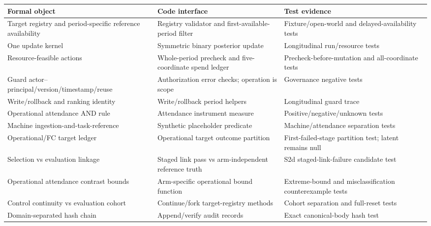\documentclass[
  11pt]{article}
\begin{document}
\begin{longtable}[]{@{}
  >{\raggedright\arraybackslash}p{}
  >{\raggedright\arraybackslash}p{}
  >{\raggedright\arraybackslash}p{}@{}}
\toprule\noalign{}
\begin{minipage}[b]{\linewidth}\raggedright
Formal object
\end{minipage} & \begin{minipage}[b]{\linewidth}\raggedright
Code interface
\end{minipage} & \begin{minipage}[b]{\linewidth}\raggedright
Test evidence
\end{minipage} \\
\midrule\noalign{}
\endhead
\bottomrule\noalign{}
\endlastfoot
Target registry and period-specific reference availability & Registry
validator and first-available-period filter & Fixture/open-world and
delayed-availability tests \\
One update kernel & Symmetric binary posterior update & Longitudinal
run/resource tests \\
Resource-feasible actions & Whole-period precheck and five-coordinate
spend ledger & Precheck-before-mutation and all-coordinate tests \\
Guard actor--principal/version/timestamp/reuse & Authorization error
checks; operation is scope & Governance negative tests \\
Write/rollback and ranking identity & Write/rollback period helpers &
Longitudinal guard trace \\
Operational attendance AND rule & Attendance instrument measure &
Positive/negative/unknown tests \\
Machine ingestion-and-task-reference & Synthetic placeholder predicate &
Machine/attendance separation tests \\
Operational/FC target ledger & Operational target outcome partition &
First-failed-stage partition test; latent remains null \\
Selection vs evaluation linkage & Staged link pass vs arm-independent
reference truth & S2d staged-link-failure candidate test \\
Operational attendance contrast bounds & Arm-specific operational bound
function & Extreme-bound and misclassification counterexample tests \\
Control continuity vs evaluation cohort & Continue/fork target-registry
methods & Cohort separation and full-reset tests \\
Domain-separated hash chain & Append/verify audit records & Exact
canonical-body hash test \\
\end{longtable}
\end{document}
